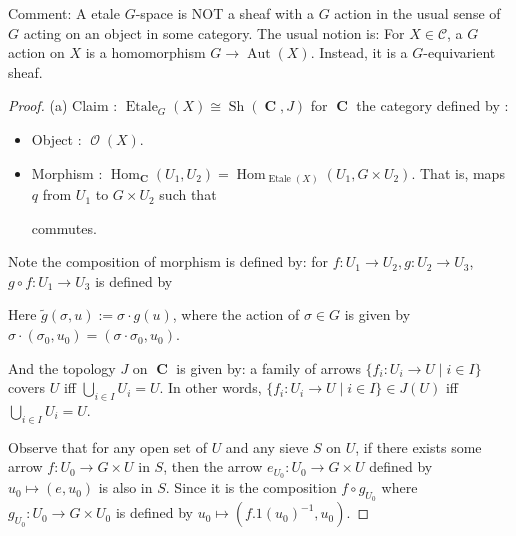 \documentclass[a4paper]{article}
\DeclareMathOperator{\C}{\mathbf {C}}
\DeclareMathOperator{\Hom}{\text {Hom}}
\DeclareMathOperator{\Aut}{\text {Aut}}
\DeclareMathOperator{\Sh}{\text {Sh}}
\DeclareMathOperator{\Et}{\text {Etale}}
\DeclareMathOperator{\mcO}{\mathcal {O}}
\begin{document}
Comment: A etale $G$-space is NOT a sheaf with a $G$ action in the usual sense of $G$ acting on an object in some category. The usual notion is: For $X\in \mathcal C$, a $G$ action on $X$ is a homomorphism $G\to \Aut(X)$. Instead, it is a $G$-equivarient sheaf. 
\begin{proof}
    (a) Claim : $\Et_G(X)\cong \Sh(\C,J)$ for $\C$ the category defined by :
    \begin{itemize}
        \item Object : $\mcO (X)$.
        \item Morphism : $\Hom_{\C}(U_1,U_2)=\Hom_{\Et(X)}(U_1,G\times U_2)$. That is, maps $q$ from $U_1$ to $G\times U_2$ such that 
        \begin{center}
        \end{center}
        commutes.
    \end{itemize}

    Note the composition of morphism is defined by: for $f:U_1\to U_2,g:U_2\to U_3$, $g\circ f:U_1\to U_3$ is defined by 
    \begin{center}
    \end{center}

    Here $\tilde{g}(\sigma, u):=\sigma \cdot g(u)$, where the action of $\sigma\in G$ is given by $\sigma\cdot (\sigma_0,u_0)=(\sigma\cdot \sigma_0,u_0)$. 

    And the topology $J$ on $\C$ is given by: a family of arrows $\{f_i:U_i\to U\mid i\in I\}$ covers $U$ iff $\bigcup_{i\in I}U_i=U$. In other words, $\{f_i:U_i\to U\mid i\in I\}\in J(U)$ iff $\bigcup_{i\in I}U_i=U$.

    Observe that for any open set of $U$ and any sieve $S$ on $U$, if there exists some arrow $f:U_0\to G\times U$ in $S$, then the arrow $e_{U_0}:U_0\to G\times U$ defined by $u_0\mapsto (e,u_0)$ is also in $S$. Since it is the composition $f\circ g_{U_0}$ where $g_{U_0}:U_0\to G\times U_0$ is defined by $u_0\mapsto (f.1(u_0)^{-1},u_0)$.


\end{proof}
\end{document}
